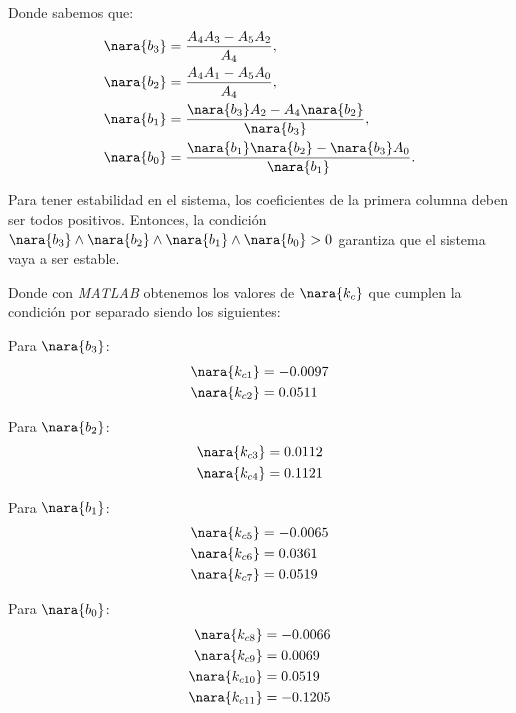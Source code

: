 Donde sabemos que:
\begin{align}
    \nara{b_3} &= \frac{A_4 A_3 - A_5 A_2}{A_4},\\ 
    \nara{b_2} &= \frac{A_4 A_1 - A_5 A_0}{A_4},\\ 
    \nara{b_1} &= \frac{\nara{b_3} A_2 - A_4 \nara{b_2}}{\nara{b_3}},\\ 
    \nara{b_0} &= \frac{\nara{b_1} \nara{b_2} - \nara{b_3} A_0}{\nara{b_1}}.
  \end{align}

Para tener estabilidad en el sistema, los coeficientes de la primera columna
deben ser todos positivos. Entonces, la condición $\nara{b_3} \land \nara{b_2} \land\nara{b_1}\land\nara{b_0}>0$ garantiza
que el sistema vaya a ser estable.

Donde con \textit{MATLAB} obtenemos los valores de $\nara{k_c}$ que cumplen la condición por separado siendo los siguientes:


\begin{multicols}{4}
    Para $\nara{b_3}$: 
    \begin{align}
        \nara{k_{c1}} & = -0.0097 \\
        \nara{k_{c2}} & = 0.0511
    \end{align}
    
    \columnbreak
    
    Para $\nara{b_2}$:
    \begin{align}
        \nara{k_{c3}} & = 0.0112 \\
        \nara{k_{c4}} & = 0.1121 \\
    \end{align}

    \columnbreak

    Para $\nara{b_1}$: 
    \begin{align}
        \nara{k_{c5}} & = -0.0065 \\
        \nara{k_{c6}} & = 0.0361 \\
        \nara{k_{c7}} & =   0.0519
    \end{align}
      
    \columnbreak

    Para $\nara{b_0}$: 
    \begin{align}
        \nara{k_{c8}} & = -0.0066 \\
        \nara{k_{c9}} & = 0.0069 \\
        \nara{k_{c10}} & = 0.0519 \\
        \nara{k_{c11}} & = -0.1205
    \end{align}

\end{multicols}

